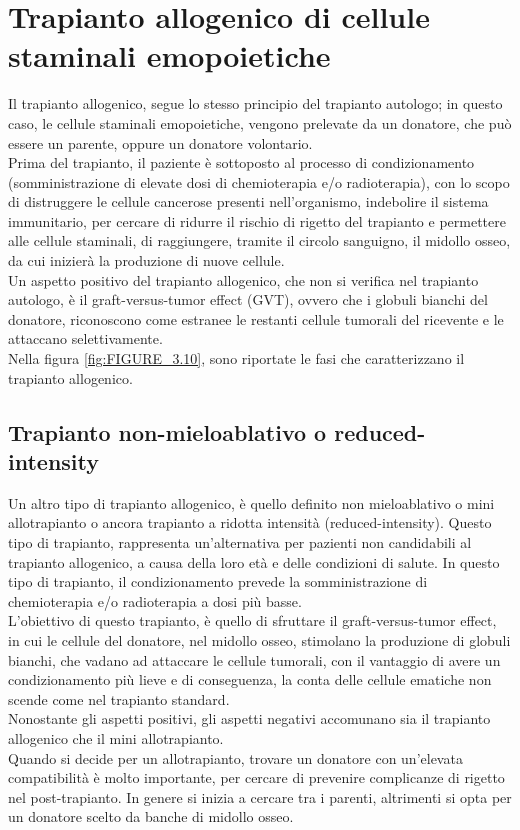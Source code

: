 \section{Trapianto allogenico di cellule staminali emopoietiche}

Il trapianto allogenico, segue lo stesso principio del trapianto autologo; in questo caso, le cellule staminali emopoietiche, 
vengono prelevate da un donatore, che può essere un parente, oppure un donatore volontario.\\ 
Prima del trapianto, il paziente è sottoposto al processo di condizionamento (somministrazione di elevate dosi di 
chemioterapia e/o radioterapia), con lo scopo di distruggere le cellule cancerose presenti nell’organismo, 
indebolire il sistema immunitario, per cercare di ridurre il rischio di rigetto del trapianto e permettere alle 
cellule staminali, di raggiungere, tramite il circolo sanguigno, il midollo osseo, da cui inizierà la produzione 
di nuove cellule.\\
Un aspetto positivo del trapianto allogenico, che non si verifica nel trapianto autologo, è il graft-versus-tumor 
effect (GVT), ovvero che i globuli bianchi del donatore, riconoscono come estranee le restanti cellule tumorali 
del ricevente e le attaccano selettivamente\cite{LLSBLOOD}.\\ Nella figura \ref{fig:FIGURE_3.10}, 
sono riportate le fasi che caratterizzano il trapianto allogenico.

\subsection{Trapianto non-mieloablativo o reduced-intensity}

Un altro tipo di trapianto allogenico, è quello definito non mieloablativo o mini allotrapianto o ancora trapianto a 
ridotta intensità (reduced-intensity). Questo tipo di trapianto, rappresenta un’alternativa per pazienti non 
candidabili al trapianto allogenico, a causa della loro età e delle condizioni di salute. In questo tipo di trapianto, 
il condizionamento prevede la somministrazione di chemioterapia e/o radioterapia a dosi più basse\cite{LLSBLOOD}.\\
L’obiettivo di questo trapianto, è quello di sfruttare il graft-versus-tumor effect, in cui le cellule del donatore, 
nel midollo osseo, stimolano la produzione di globuli bianchi, che vadano ad attaccare le cellule tumorali, con il 
vantaggio di avere un condizionamento più lieve e di conseguenza, la conta delle cellule ematiche 
non scende come nel trapianto standard\cite{STEMCELLS}.\\
Nonostante gli aspetti positivi, gli aspetti negativi accomunano sia il trapianto allogenico che il mini allotrapianto.\\
Quando si decide per un allotrapianto, trovare un donatore con un’elevata compatibilità è molto importante, 
per cercare di prevenire complicanze di rigetto nel post-trapianto. In genere si inizia a cercare tra i parenti, 
altrimenti si opta per un donatore scelto da banche di midollo osseo\cite{TRAPIANTO}.

